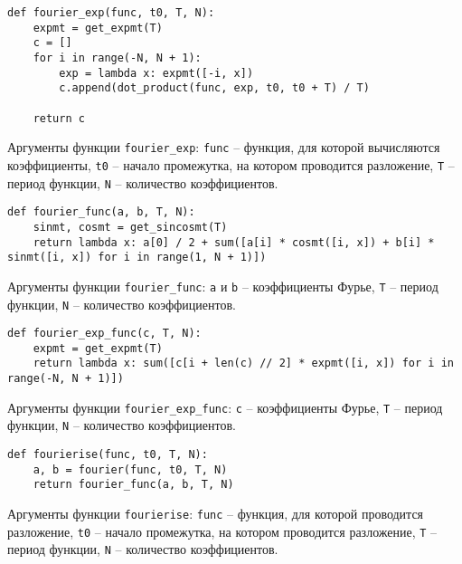 \begin{lstlisting}[style=python_white, caption=Функция для вычисления коэффициентов Фурье, label=lst:fourier_exp]
def fourier_exp(func, t0, T, N):
    expmt = get_expmt(T)
    c = []
    for i in range(-N, N + 1):
        exp = lambda x: expmt([-i, x])
        c.append(dot_product(func, exp, t0, t0 + T) / T)

    return c
\end{lstlisting}
Аргументы функции \texttt{fourier\_exp}: \texttt{func} -- функция, для которой вычисляются коэффициенты, \texttt{t0} -- начало промежутка, на котором проводится разложение, \texttt{T} -- период функции, \texttt{N} -- количество коэффициентов.
\newline

\begin{lstlisting}[style=python_white, caption=Получение функции частичной суммы рядя Фурье до $N$, label=lst:fourier_func]
def fourier_func(a, b, T, N):
    sinmt, cosmt = get_sincosmt(T)
    return lambda x: a[0] / 2 + sum([a[i] * cosmt([i, x]) + b[i] * sinmt([i, x]) for i in range(1, N + 1)])
\end{lstlisting}
Аргументы функции \texttt{fourier\_func}: \texttt{a} и \texttt{b} -- коэффициенты Фурье, \texttt{T} -- период функции, \texttt{N} -- количество коэффициентов.
\newline

\begin{lstlisting}[style=python_white, caption=Получение функции частичной суммы рядя Фурье до $N$, label=lst:fourier_func_exp]
def fourier_exp_func(c, T, N):
    expmt = get_expmt(T)
    return lambda x: sum([c[i + len(c) // 2] * expmt([i, x]) for i in range(-N, N + 1)])
\end{lstlisting}
Аргументы функции \texttt{fourier\_exp\_func}: \texttt{c} -- коэффициенты Фурье, \texttt{T} -- период функции, \texttt{N} -- количество коэффициентов.
\newline
    
\begin{lstlisting}[style=python_white, caption=Функция для получения разложения Фурье функции, label=lst:fourierise]
def fourierise(func, t0, T, N):
    a, b = fourier(func, t0, T, N)
    return fourier_func(a, b, T, N)
\end{lstlisting}
Аргументы функции \texttt{fourierise}: \texttt{func} -- функция, для которой проводится разложение, \texttt{t0} -- начало промежутка, на котором проводится разложение, \texttt{T} -- период функции, \texttt{N} -- количество коэффициентов.
\newline

